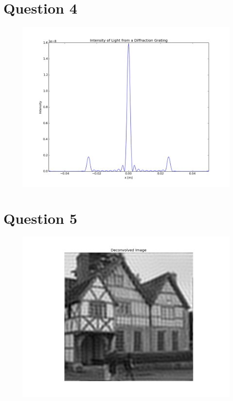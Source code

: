 \documentclass[a4paper,12pt]{article}
\begin{document}
\section{Question 4}

\begin{figure}[H]
\centering
\includegraphics[width = \linewidth]{lab5q4.png}
\caption{}
\label{fig:q4}
\end{figure}

\section{Question 5}

\begin{figure}[H]
\centering
\includegraphics[width = \linewidth]{lab5q5.png}
\caption{}
\label{fig:q5}
\end{figure}
\end{document}
